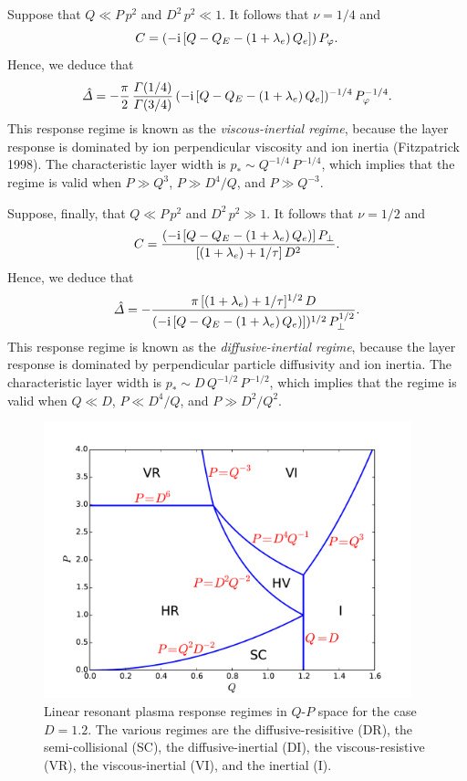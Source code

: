 \documentclass[notitlepage,12pt]{article}
\begin{document}
Suppose that $Q\ll P\,p^2$ and $D^2\,p^2 \ll 1$. It follows that $\nu=1/4$ and
\begin{equation}
C = (-{\rm i}\,[Q-Q_E-(1+\lambda_e)\,Q_e])\,P_\varphi.
\end{equation}
Hence, we deduce that
\begin{equation}
\hat{\mit\Delta} =- \frac{\pi}{2}\,\frac{{\mit\Gamma}(1/4)}{{\mit\Gamma}(3/4)}\, (-{\rm i}\,[Q-Q_E-(1+\lambda_e)\,Q_e])^{-1/4}\,P_\varphi^{-1/4}.
\end{equation}
This response regime is known as the {\em viscous-inertial regime}, because the layer response is dominated by
ion perpendicular viscosity and ion inertia (Fitzpatrick 1998). 
 The characteristic layer width is $p_\ast \sim Q^{-1/4}\,P^{-1/4}$,
which implies that the regime is valid when $P\gg Q^3$, $P\gg D^4/Q$, and $P\gg Q^{-3}$. 

Suppose, finally, that $Q\ll P\,p^2$ and $D^2\,p^2\gg 1$. It follows that $\nu=1/2$ and
\begin{equation}
C = \frac{(-{\rm i}\,[Q-Q_E-(1+\lambda_e)\,Q_e)]\,P_\perp}{[(1+\lambda_e)+1/\tau]\,D^2}.
\end{equation}
Hence, we deduce that
\begin{equation}
\hat{\mit\Delta}= -\frac{\pi\,[(1+\lambda_e)+1/\tau]^{1/2}\,D}{(-{\rm i}\,[Q-Q_E-(1+\lambda_e)\,Q_e)])^{1/2}\,P_\perp^{1/2}}.
\end{equation}
This response regime is known as the {\em diffusive-inertial regime}, because the
layer response is dominated by perpendicular particle diffusivity and ion inertia. The characteristic layer width is $p_\ast\sim
D\,Q^{-1/2}\,P^{-1/2}$, which implies that the regime is valid when $Q\ll D$, $P\ll D^4/Q$, and $P\gg D^2/Q^2$. 

\begin{figure}[t]
\centerline{\includegraphics[width=0.95\textwidth]{RegimeII.pdf}}
\caption{Linear resonant plasma response regimes in $Q$-$P$ space for the case $D=1.2$. The various regimes are
the diffusive-resisitive (DR), the semi-collisional (SC), the diffusive-inertial (DI), the viscous-resistive (VR), the viscous-inertial
(VI), and the inertial (I).}\label{f2}
\end{figure}
\end{document}
